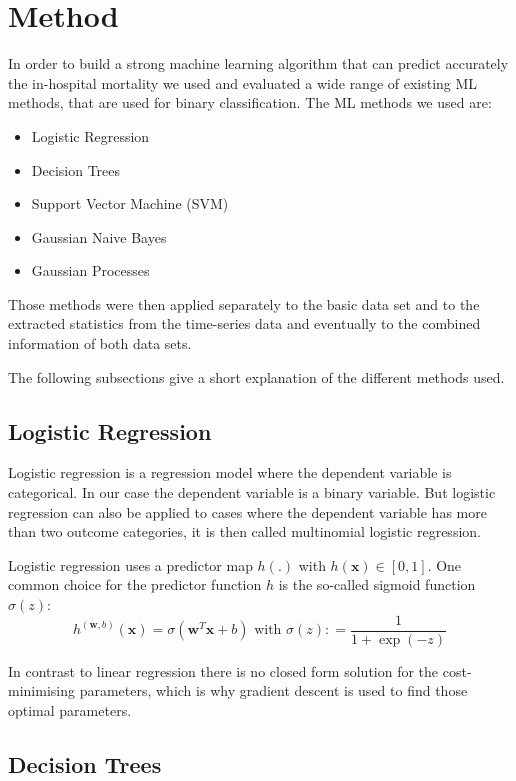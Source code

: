 \documentclass[a4paper,11pt]{article}
\begin{document}
\section{Method}

In order to build a strong machine learning algorithm that can predict accurately the in-hospital mortality we used and evaluated a wide range of existing ML methods, that are used for binary classification. The ML methods we used are:

\begin{itemize}
    \item Logistic Regression
    \item Decision Trees
    \item Support Vector Machine (SVM)
    \item Gaussian Naive Bayes
    \item Gaussian Processes
\end{itemize}

Those methods were then applied separately to the basic data set and to the extracted statistics from the time-series data and eventually to the combined information of both data sets.

The following subsections give a short explanation of the different methods used.

\subsection*{Logistic Regression}

Logistic regression is a regression model where the dependent variable is categorical. In our case the dependent variable is a binary variable. But logistic regression can also be applied to cases where the dependent variable has more than two outcome categories, it is then called multinomial logistic regression.

Logistic regression uses a  predictor map $ h(.)$ with $h ( \mathbf { x } ) \in [ 0,1] $. One common choice for the predictor function $h$ is the so-called sigmoid function $ \sigma ( z ) $:
$$ h ^ { ( \mathbf { w } ,b ) } ( \mathbf { x } ) = \sigma \left( \mathbf { w } ^ { T } \mathbf { x } + b \right) \text{ with } \sigma ( z ) : = \frac{1}{1+ \exp ( - z )}  $$

In contrast to linear regression there is no closed form solution for the cost-minimising parameters, which is why gradient descent is used to find those optimal parameters.

\subsection*{Decision Trees}
\end{document}
